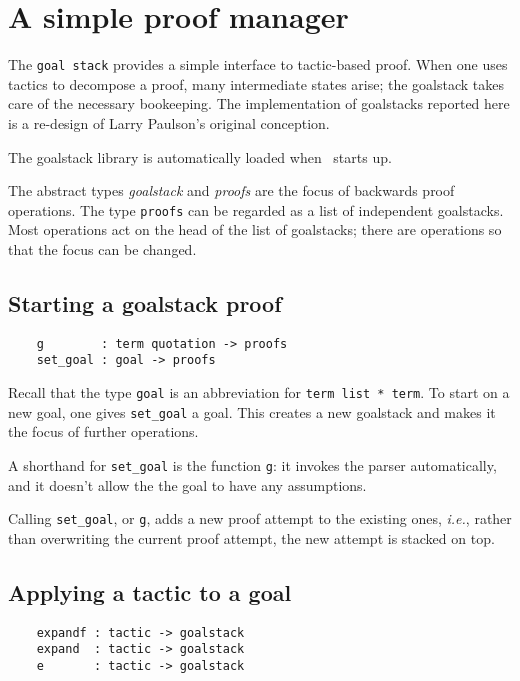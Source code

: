 \section{A simple proof manager}\label{sec:goalstack}

The \texttt{goal stack} provides a simple interface to tactic-based
proof. When one uses tactics to decompose a proof, many intermediate
states arise; the goalstack takes care of the necessary bookeeping. The
implementation of goalstacks reported here is a re-design of Larry
Paulson's original conception.

The goalstack library is automatically loaded when \HOL\ starts up.

The abstract types \textit{goalstack} and \textit{proofs} are the
focus of backwards proof operations. The type \verb+proofs+ can be
regarded as a list of independent goalstacks. Most operations act on
the head of the list of goalstacks; there are operations so that the
focus can be changed.

\subsection{Starting a goalstack proof}

\begin{verbatim}
    g        : term quotation -> proofs
    set_goal : goal -> proofs
\end{verbatim}

Recall that the type \verb+goal+ is an abbreviation for
\verb+term list * term+. To start on a new goal, one gives
\verb+set_goal+ a goal. This creates a new goalstack and makes it the
focus of further operations.

A shorthand for \verb+set_goal+ is the function \verb+g+: it
invokes the parser automatically, and it doesn't allow the the goal to
have any assumptions.

Calling \verb+set_goal+, or \verb+g+, adds a new proof attempt to the
existing ones, \textit{i.e.}, rather than overwriting the current
proof attempt, the new attempt is stacked on top.

\subsection{Applying a tactic to a goal}

\begin{verbatim}
    expandf : tactic -> goalstack
    expand  : tactic -> goalstack
    e       : tactic -> goalstack
\end{verbatim}

